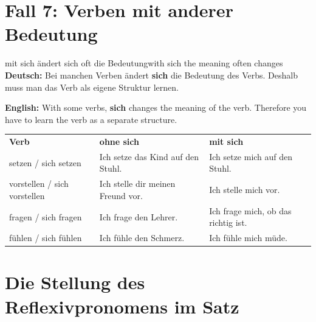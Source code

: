 \documentclass[a4paper,11pt]{article}
\newcommand{\GermanText}[1]{\textbf{Deutsch: }#1\par}
\newcommand{\EnglishText}[1]{{\small\color{SoftGray}\textbf{English: }#1\par}}
\newcommand{\HeaderCell}[1]{\cellcolor{HeaderBlueDark}\color{white}\bfseries #1}
\begin{document}
    
    \section{Fall 7: Verben mit anderer Bedeutung}
        
        \begin{grammarentry}{mit sich ändert sich oft die Bedeutung}{with sich the meaning often changes}
            \GermanText{Bei manchen Verben ändert \textbf{sich} die Bedeutung des Verbs. Deshalb muss man das Verb als eigene Struktur lernen.}
            \EnglishText{With some verbs, \textbf{sich} changes the meaning of the verb. Therefore you have to learn the verb as a separate structure.}
            
            \begin{longtable}{>{\raggedright\arraybackslash}p{}>{\raggedright\arraybackslash}p{}>{\raggedright\arraybackslash}p{}}
                \HeaderCell{Verb} & \HeaderCell{ohne sich} & \HeaderCell{mit sich} \\
                setzen / sich setzen & Ich setze das Kind auf den Stuhl. & Ich setze mich auf den Stuhl. \\
                vorstellen / sich vorstellen & Ich stelle dir meinen Freund vor. & Ich stelle mich vor. \\
                fragen / sich fragen & Ich frage den Lehrer. & Ich frage mich, ob das richtig ist. \\
                fühlen / sich fühlen & Ich fühle den Schmerz. & Ich fühle mich müde. \\
            \end{longtable}
        \end{grammarentry}
    
    

    \section{Die Stellung des Reflexivpronomens im Satz}
\end{document}

